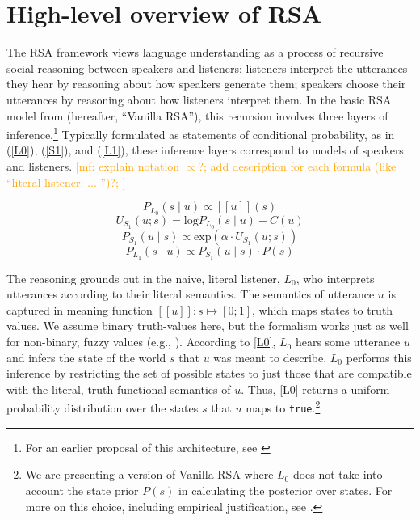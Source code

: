 \documentclass{sp}
\newcommand{\mf}[1]{\textcolor{orange}{[mf: #1]}}
\newcommand{\mht}[1]{\textcolor{purple}{[mht: #1]}}
\newcommand{\sem}[1]{\ensuremath{[\![#1]\!]}}
\begin{document}
\section{High-level overview of RSA} \label{overview}

The RSA framework views language understanding as a process of recursive social reasoning between speakers and listeners: listeners interpret the utterances they hear by reasoning about how speakers generate them; speakers choose their utterances by reasoning about how listeners interpret them. In the basic RSA model from \cite{frankgoodman2012} (hereafter, ``Vanilla RSA''), this recursion involves three layers of inference.\footnote{For an earlier proposal of this architecture, see \cite{BenzvanRooijOptimalAssertions2007}} Typically formulated as statements of conditional probability, as in (\ref{L0}), (\ref{S1}), and (\ref{L1}), these inference layers correspond to models of speakers and listeners. \mf{explain notation $\propto$?; add description for each formula (like ``literal listener: ... '')?; }

\begin{equation} \label{L0}
P_{L_0}(s \mid u) \propto \sem{u}(s)
\end{equation}
\begin{equation} \label{U}
U_{S_1}(u; s) = \textrm{log}P_{L_0}(s \mid u) - C(u)
\end{equation}
\begin{equation} \label{S1}
P_{S_1}(u \mid s) \propto \textrm{exp}(\alpha \cdot U_{S_1}(u;s))
\end{equation}
\begin{equation} \label{L1}
P_{L_1}(s \mid u) \propto P_{S_1}(u \mid s) \cdot P(s)
\end{equation}

The reasoning grounds out in the naive, literal listener, $L_0$, who interprets utterances
according to their literal semantics. The semantics of utterance $u$ is captured in meaning
function $\sem{u} \colon s \mapsto [0;1]$, which maps states to truth values. We assume binary
truth-values here, but the formalism works just as well for non-binary, fuzzy values (e.g., \citealp{degenetal2020}). 
According to \eqref{L0}, $L_0$ hears some utterance $u$ and infers the state of the world $s$ that $u$ was
meant to describe. $L_0$ performs this inference by restricting the set of possible states to just those that are compatible
with the literal, truth-functional semantics of $u$.
Thus, \eqref{L0} returns a uniform probability distribution over the states $s$ that $u$ maps to \texttt{true}.\footnote{We are presenting a version of Vanilla RSA where $L_0$ does not take into account the state prior $P(s)$ in calculating the posterior over states. For more on this choice, including empirical justification, see \cite{qingfranke2015}.}
\end{document}
